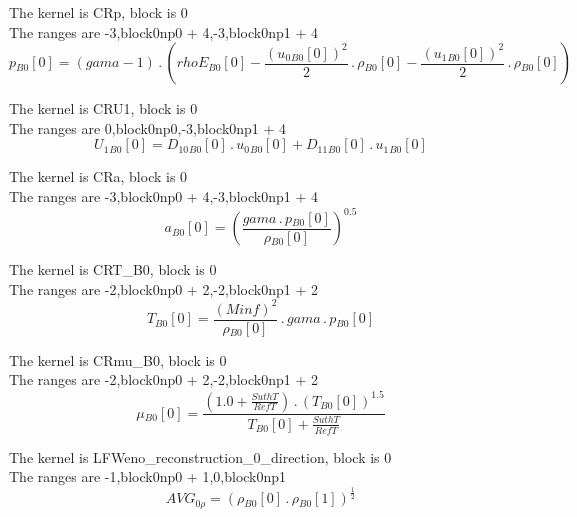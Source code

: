 \documentclass{article}
\begin{document}
\noindent The kernel is CRp, block is 0\\\noindent The ranges are -3,block0np0 + 4,-3,block0np1 + 4\\\begin{dmath}{p{_{B0}}}[{0}] = \left(gama - 1\right) \,.\, \left({rhoE{_{B0}}}[{0}] - \frac{\left({u_{0}{_{B0}}}[{0}] \right)^{2}}{2} \,.\, {\rho{_{B0}}}[{0}] - \frac{\left({u_{1}{_{B0}}}[{0}] \right)^{2}}{2} \,.\, 
{\rho{_{B0}}}[{0}]\right)\end{dmath}

\noindent The kernel is CRU1, block is 0\\\noindent The ranges are 0,block0np0,-3,block0np1 + 4\\\begin{dmath}{U_{1}{_{B0}}}[{0}] = {D_{10}{_{B0}}}[{0}] \,.\, {u_{0}{_{B0}}}[{0}] + {D_{11}{_{B0}}}[{0}] \,.\, {u_{1}{_{B0}}}[{0}]\end{dmath}

\noindent The kernel is CRa, block is 0\\\noindent The ranges are -3,block0np0 + 4,-3,block0np1 + 4\\\begin{dmath}{a{_{B0}}}[{0}] = \left(\frac{gama \,.\, {p{_{B0}}}[{0}]}{{\rho{_{B0}}}[{0}]} \right)^{0.5}\end{dmath}

\noindent The kernel is CRT_B0, block is 0\\\noindent The ranges are -2,block0np0 + 2,-2,block0np1 + 2\\\begin{dmath}{T{_{B0}}}[{0}] = \frac{\left(Minf \right)^{2}}{{\rho{_{B0}}}[{0}]} \,.\, gama \,.\, {p{_{B0}}}[{0}]\end{dmath}

\noindent The kernel is CRmu_B0, block is 0\\\noindent The ranges are -2,block0np0 + 2,-2,block0np1 + 2\\\begin{dmath}{\mu{_{B0}}}[{0}] = \frac{\left(1.0 + \frac{SuthT}{RefT}\right) \,.\, \left({T{_{B0}}}[{0}] \right)^{1.5}}{{T{_{B0}}}[{0}] + \frac{SuthT}{RefT}}\end{dmath}

\noindent The kernel is LFWeno_reconstruction_0_direction, block is 0\\\noindent The ranges are -1,block0np0 + 1,0,block0np1\\\begin{dmath}AVG_{0 \rho} = \left({\rho{_{B0}}}[{0}] \,.\, {\rho{_{B0}}}[{1}] \right)^{\frac{1}{2}}\end{dmath}
\end{document}
